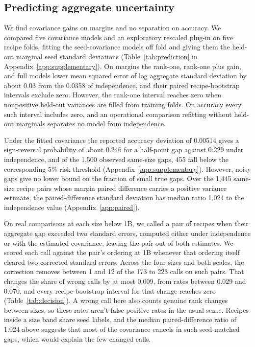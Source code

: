 \subsection{Predicting aggregate uncertainty}
\label{sec:prediction}
We find covariance gains on margins and no separation on accuracy. We compared five covariance models and an exploratory rescaled plug-in on five recipe folds, fitting the seed-covariance models off fold and giving them the held-out marginal seed standard deviations (Table~\ref{tab:prediction} in Appendix~\ref{app:supplementary}). On margins the rank-one, rank-one plus gain, and full models lower mean squared error of log aggregate standard deviation by about 0.03 from the 0.0358 of independence, and their paired recipe-bootstrap intervals exclude zero. However, the rank-one interval reaches zero when nonpositive held-out variances are filled from training folds. On accuracy every such interval includes zero, and an operational comparison refitting without held-out marginals separates no model from independence.

Under the fitted covariance the reported accuracy deviation of 0.00514 gives a sign-reversal probability of about 0.246 for a half-point gap against 0.229 under independence, and of the 1,500 observed same-size gaps, 455 fall below the corresponding 5\% risk threshold (Appendix~\ref{app:supplementary}). However, noisy gaps give no lower bound on the fraction of small true gaps. Over the 1,445 same-size recipe pairs whose margin paired difference carries a positive variance estimate, the paired-difference standard deviation has median ratio 1.024 to the independence value (Appendix~\ref{app:paired}).

On real comparisons at each size below 1B, we called a pair of recipes when their aggregate gap exceeded two standard errors, computed either under independence or with the estimated covariance, leaving the pair out of both estimates. We scored each call against the pair's ordering at 1B whenever that ordering itself cleared two corrected standard errors. Across the four sizes and both scales, the correction removes between 1 and 12 of the 173 to 223 calls on such pairs. That changes the share of wrong calls by at most 0.009, from rates between 0.029 and 0.070, and every recipe-bootstrap interval for that change reaches zero (Table~\ref{tab:decision}). A wrong call here also counts genuine rank changes between sizes, so these rates aren't false-positive rates in the usual sense. Recipes inside a size band share seed labels, and the median paired-difference ratio of 1.024 above suggests that most of the covariance cancels in such seed-matched gaps, which would explain the few changed calls.

